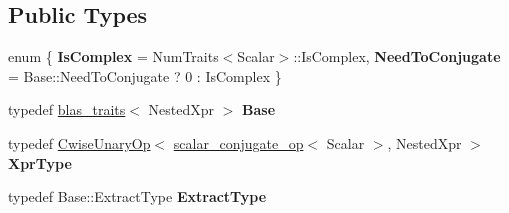 \subsection*{Public Types}
\begin{DoxyCompactItemize}
\item 
\mbox{\label{struct_eigen_1_1internal_1_1blas__traits_3_01_cwise_unary_op_3_01scalar__conjugate__op_3_01_scal305db6e51b207e2ce8fc6ea06996a706_afe228c92af89640cf9405407029c45cd}} 
enum \{ {\bfseries Is\+Complex} = Num\+Traits$<$Scalar$>$\+::Is\+Complex, 
{\bfseries Need\+To\+Conjugate} = Base\+::Need\+To\+Conjugate ? 0 \+: Is\+Complex
 \}
\item 
\mbox{\label{struct_eigen_1_1internal_1_1blas__traits_3_01_cwise_unary_op_3_01scalar__conjugate__op_3_01_scal305db6e51b207e2ce8fc6ea06996a706_aacef013bcf0786ae648c43747b65f2b7}} 
typedef \mbox{\hyperlink{struct_eigen_1_1internal_1_1blas__traits}{blas\+\_\+traits}}$<$ Nested\+Xpr $>$ {\bfseries Base}
\item 
\mbox{\label{struct_eigen_1_1internal_1_1blas__traits_3_01_cwise_unary_op_3_01scalar__conjugate__op_3_01_scal305db6e51b207e2ce8fc6ea06996a706_a424e24e7403aae75d6c5dc539fb85b90}} 
typedef \mbox{\hyperlink{class_eigen_1_1_cwise_unary_op}{Cwise\+Unary\+Op}}$<$ \mbox{\hyperlink{struct_eigen_1_1internal_1_1scalar__conjugate__op}{scalar\+\_\+conjugate\+\_\+op}}$<$ Scalar $>$, Nested\+Xpr $>$ {\bfseries Xpr\+Type}
\item 
\mbox{\label{struct_eigen_1_1internal_1_1blas__traits_3_01_cwise_unary_op_3_01scalar__conjugate__op_3_01_scal305db6e51b207e2ce8fc6ea06996a706_ad5d64836de0bd79d6c6ca3cea647d27b}} 
typedef Base\+::\+Extract\+Type {\bfseries Extract\+Type}
\end{DoxyCompactItemize}
